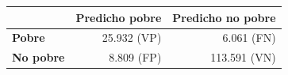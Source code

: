 \begin{tabular}{lrr}
\toprule
 & \textbf{Predicho pobre} & \textbf{Predicho no pobre} \\
\midrule
\textbf{Pobre} & 25.932 (VP) & 6.061 (FN) \\
\textbf{No pobre} & 8.809 (FP) & 113.591 (VN) \\
\bottomrule
\end{tabular}
